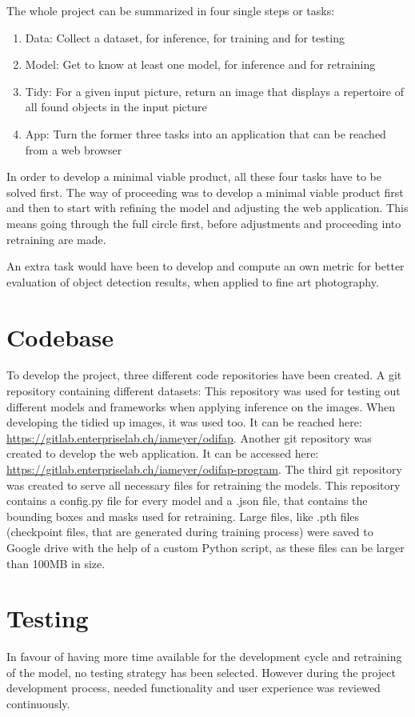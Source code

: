 The whole project can be summarized in four single steps or tasks:
\begin{enumerate}
	\item Data: Collect a dataset, for inference, for training and for testing
	\item Model: Get to know at least one model, for inference and for retraining
	\item Tidy: For a given input picture, return an image that displays a repertoire of all found objects in the input picture
	\item App: Turn the former three tasks into an application that can be reached from a web browser
\end{enumerate}

In order to develop a minimal viable product, all these four tasks have to be solved first. The way of proceeding was to develop a minimal viable product first and then to start with refining the model and adjusting the web application. This means going through the full circle first, before adjustments and proceeding into retraining are made.

An extra task would have been to develop and compute an own metric for better evaluation of object detection results, when applied to fine art photography.

\section{Codebase}

To develop the project, three different code repositories have been created. A git repository containing different datasets: This repository was used for testing out different models and frameworks when applying inference on the images. When developing the tidied up images, it was used too. It can be reached here: \url{https://gitlab.enterpriselab.ch/iameyer/odifap}.
Another git repository was created to develop the web application. It can be accessed here: \url{https://gitlab.enterpriselab.ch/iameyer/odifap-program}.
The third git repository was created to serve all necessary files for retraining the models. This repository contains a config.py file for every model and a .json file, that contains the bounding boxes and masks used for retraining.
Large files, like .pth files (checkpoint files, that are generated during training process) were saved to Google drive with the help of a custom Python script, as these files can be larger than 100MB in size.

\section{Testing}

In favour of having more time available for the development cycle and retraining of the model, no testing strategy has been selected. However during the project development process, needed functionality and user experience was reviewed continuously.